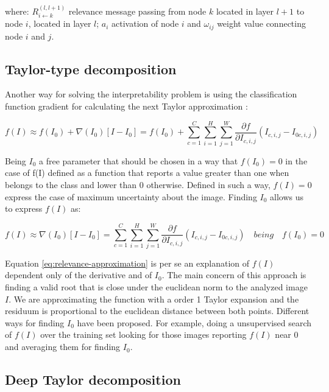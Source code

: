 \documentclass[review]{elsarticle}
\theoremstyle{definition} %
\theoremstyle{remark}
\begin{document}
where: $R_{i \leftarrow k}^{(l,l+1)}$ relevance message passing from node $k$ located in layer $l+1$ to node $i$, located in layer $l$; $a_i$ activation of node $i$ and $\omega_{ij}$ weight value connecting node $i$ and $j$.

\subsection{Taylor-type decomposition} 

Another way for solving the interpretability problem is using the classification function gradient for calculating the next Taylor approximation \cite{bach2015pixel}:

\begin{equation}
f(I) \approx f(I_0) + \nabla(I_0) [ I - I_0] = f(I_0) + \sum_{c=1}^C \sum_{i=1}^{H} \sum_{j=1}^W \frac{\partial f}{\partial I_{c,i,j}}(I_{c,i,j} - I_{0 c, i, j}) 
\label{eq:taylor}
\end{equation}

Being $I_0$ a free parameter that should be chosen in a way that $f(I_0) = 0$ in the case of f(I) defined as a function that reports a value greater than one when belongs to the class and lower than 0 otherwise. Defined in such a way, $f(I) = 0$ express the case of maximum uncertainty about the image. Finding $I_0$ allows us to express $f(I)$ as:

\begin{equation}
f(I) \approx \nabla(I_0) [ I - I_0] = \sum_{c=1}^C \sum_{i=1}^{H} \sum_{j=1}^W \frac{\partial f}{\partial I_{c,i,j}}(I_{c,i,j} - I_{0 c, i, j}) \quad  being \quad f(I_0) = 0
\label{eq:relevance-approximation}
\end{equation}

Equation \ref{eq:relevance-approximation} is per se an explanation of $f(I)$ dependent only of the derivative and of $I_0$. The main concern of this approach is finding a valid root that is close under the euclidean norm to the analyzed image $I$. We are approximating the function with a order 1 Taylor expansion and the residuum is proportional to the euclidean distance between both points. Different ways for finding $I_0$ have been proposed. For example, doing a unsupervised search of $f(I)$ over the training set looking for those images reporting $f(I)$ near 0 and averaging them for finding $I_0$.

\subsection{Deep Taylor decomposition}
\end{document}
